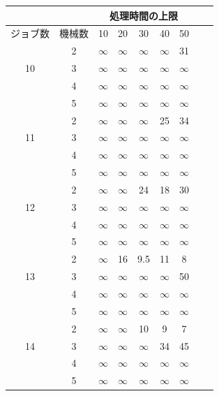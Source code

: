 \documentclass[12pt]{optlab-bachelor}
\begin{document}
\begin{table}[htb]
  \begin{center}
    \begin{tabular}{|c|c|c|c|c|c|c|c|c|} \hline
      &  & \multicolumn{5}{c|}{処理時間の上限} \\ \hline
      ジョブ数 & 機械数& 10 & 20 & 30 & 40 & 50 \\ \hline \hline

      & 2 & $\infty$ & $\infty$ & $\infty$ & $\infty$ & 31   \\ \cline{2-7}
      10 & 3 & $\infty$ & $\infty$ & $\infty$ & $\infty$ & $\infty$ \\ \cline{2-7}
      & 4 & $\infty$ & $\infty$ & $\infty$ & $\infty$ & $\infty$ \\ \cline{2-7}
      & 5 & $\infty$ & $\infty$ & $\infty$ & $\infty$ & $\infty$ \\ \hline \hline

      & 2 & $\infty$ & $\infty$ & $\infty$ & 25 & 34 \\ \cline{2-7}
      11 & 3 & $\infty$ & $\infty$ & $\infty$ & $\infty$  & $\infty$ \\ \cline{2-7}
      & 4 & $\infty$ & $\infty$ & $\infty$ & $\infty$ & $\infty$ \\ \cline{2-7}
      & 5 & $\infty$ & $\infty$ & $\infty$ & $\infty$ & $\infty$ \\ \hline \hline

      & 2 & $\infty$ & $\infty$ & 24 & 18 & 30   \\ \cline{2-7}
      12 & 3 & $\infty$ & $\infty$ & $\infty$ & $\infty$ & $\infty$ \\ \cline{2-7}
      & 4 & $\infty$ & $\infty$ & $\infty$ & $\infty$ & $\infty$ \\ \cline{2-7}
      & 5 & $\infty$ & $\infty$ & $\infty$ & $\infty$ & $\infty$  \\ \hline \hline

      & 2 & $\infty$ & 16 & 9.5 & 11 & 8 \\ \cline{2-7}
      13 & 3 & $\infty$ & $\infty$ & $\infty$ & $\infty$ & 50 \\ \cline{2-7}
      & 4 & $\infty$ & $\infty$ & $\infty$ & $\infty$ & $\infty$ \\ \cline{2-7}
      & 5 & $\infty$ & $\infty$ & $\infty$ & $\infty$ & $\infty$ \\ \hline \hline

      & 2 & $\infty$ & $\infty$ & 10 & 9 & 7 \\ \cline{2-7}
      14 & 3 & $\infty$ & $\infty$ & $\infty$ & 34 & 45 \\ \cline{2-7}
      & 4 & $\infty$ & $\infty$ & $\infty$ & $\infty$ & $\infty$ \\ \cline{2-7}
      & 5 & $\infty$ & $\infty$ & $\infty$ & $\infty$ & $\infty$ \\ \hline \hline


\end{tabular}
\end{center}
\end{table}
\end{document}
